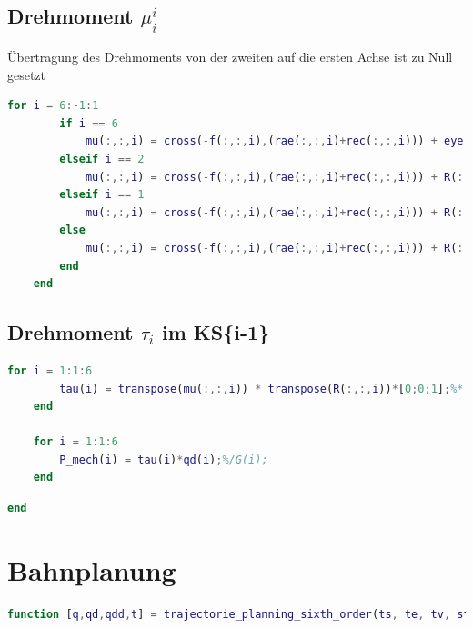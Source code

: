\subsection{Drehmoment $\mu^{i}_i$}
Übertragung des Drehmoments von der zweiten auf die ersten Achse ist zu Null gesetzt
\begin{lstlisting}[language=Matlab, numbers=none]
	for i = 6:-1:1
		if i == 6
			mu(:,:,i) = cross(-f(:,:,i),(rae(:,:,i)+rec(:,:,i))) + eye(3)*[0;0;0] + eye(3)*cross([0;0;0], rec(:,:,i)) + I(:,:,i)*omega_d(:,:,i) + cross(omega(:,:,i),(I(:,:,i)*omega(:,:,i)));
		elseif i == 2
			mu(:,:,i) = cross(-f(:,:,i),(rae(:,:,i)+rec(:,:,i))) + R(:,:,i+1)*mu(:,:,i+1) + R(:,:,i+1)*cross(f(:,:,i+1), rec(:,:,i)) + I(:,:,i)*omega_d(:,:,i) + 	cross(omega(:,:,i),(I(:,:,i)*omega(:,:,i)))- mugrav(:,:,i);
		elseif i == 1
			mu(:,:,i) = cross(-f(:,:,i),(rae(:,:,i)+rec(:,:,i))) + R(:,:,i+1)*cross(f(:,:,i+1), rec(:,:,i)) + I(:,:,i)*omega_d(:,:,i) + 	cross(omega(:,:,i),(I(:,:,i)*omega(:,:,i)));
		else
			mu(:,:,i) = cross(-f(:,:,i),(rae(:,:,i)+rec(:,:,i))) + R(:,:,i+1)*mu(:,:,i+1) + R(:,:,i+1)*cross(f(:,:,i+1), rec(:,:,i)) + I(:,:,i)*omega_d(:,:,i) + 	cross(omega(:,:,i),(I(:,:,i)*omega(:,:,i)));
		end
	end
\end{lstlisting}
%
\subsection{Drehmoment $\tau_i$ im KS\{i-1\}}
%
\begin{lstlisting}[language=Matlab, numbers=none]
	for i = 1:1:6
		tau(i) = transpose(mu(:,:,i)) * transpose(R(:,:,i))*[0;0;1];%* G(i)
	end
	
	for i = 1:1:6
		P_mech(i) = tau(i)*qd(i);%/G(i);
	end
\end{lstlisting}
\begin{lstlisting}[language=Matlab, numbers=none]
	end
\end{lstlisting}
\setcounter{section}{3}
\section{Bahnplanung}
\label{add:traj}
%
\begin{lstlisting}[language=Matlab, numbers=none]
	function [q,qd,qdd,t] = trajectorie_planning_sixth_order(ts, te, tv, stepsize, qs, qds, qdds, qv, qe, qde, qdde)
\end{lstlisting}
\begin{lstlisting}[language=Matlab, numbers=none]
	% Bahnplanung über ein Polynom 6-ter Ordnung inkl. Gelenkwinkel-Definition des Via-Punkts
\end{lstlisting}
%
